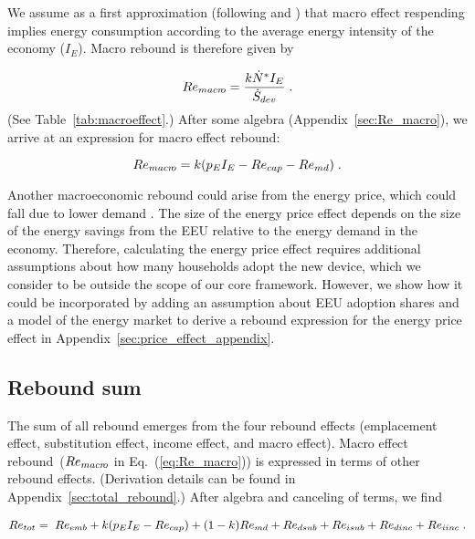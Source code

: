 \documentclass[12pt]{article}\usepackage[]{graphicx}\usepackage[]{xcolor}
\begin{document}
We assume as a first approximation
(following \citet{Antal:2014aa} and \citet{Borenstein:2015aa}) 
that macro effect respending
implies energy consumption according to 
the average energy intensity of the economy ($I_E$).
Macro rebound is therefore given by

\begin{equation} \label{eq:Re_macro_def}
  Re_{macr\!o} = \frac{k {\dot{N}}^* I_E}{\dot{S}_{dev}} \; .
\end{equation}
%
(See Table~\ref{tab:macroeffect}.) 
After some algebra (Appendix~\ref{sec:Re_macro}), 
we arrive at an expression for macro effect rebound:

\begin{equation} \label{eq:Re_macro}
  Re_{macr\!o} = k (p_E I_E - Re_{cap} - Re_{md}){} \; .
\end{equation}

Another macroeconomic rebound could arise from the energy price,
which could fall due to lower demand \citep{Gillingham2016,Borenstein:2015aa}.
The size of the energy price effect
depends on the size of the energy savings from the EEU
relative to the energy demand in the economy. 
Therefore, calculating the energy price effect requires additional
assumptions about how many households adopt the new device, 
which we consider to be outside the scope of our core framework. 
However, we show how it could be incorporated
by adding an assumption about EEU adoption shares and 
a model of the energy market to 
derive a rebound expression 
for the energy price effect
in Appendix~\ref{sec:price_effect_appendix}.


\subsection{Rebound sum}
\label{sec:total_rebound_main_paper}

The sum of all rebound emerges from the four rebound effects
(emplacement effect, substitution effect, income effect, and macro effect).
Macro effect rebound~($Re_{macr\!o}$ in Eq.~(\ref{eq:Re_macro}))
is expressed in terms of other rebound effects.
(Derivation details can be found in Appendix~\ref{sec:total_rebound}.)
After algebra and canceling of terms,
we find

\begin{align} \label{eq:Re_tot}  
  Re_{tot} = \; Re_{emb} + k (p_E I_E - Re_{cap}) + (1-k) Re_{md} + Re_{dsub} + Re_{isub} + Re_{dinc} + Re_{iinc}{} \; .
\end{align}


\end{document}
